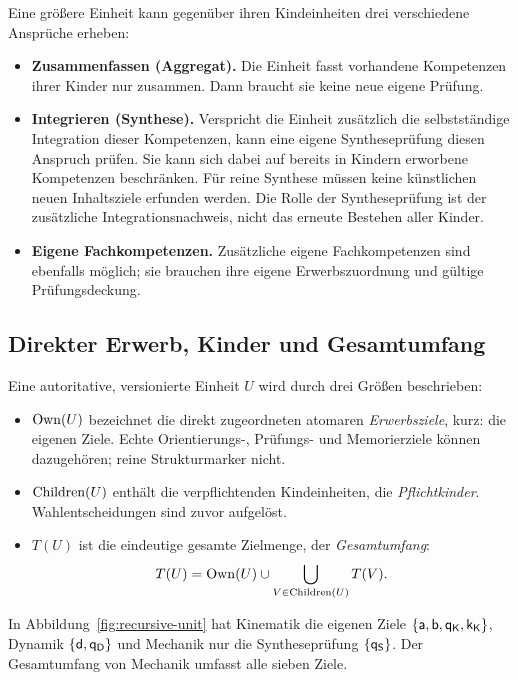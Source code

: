 Eine größere Einheit kann gegenüber ihren Kindeinheiten drei verschiedene
Ansprüche erheben:
\begin{itemize}
\item \textbf{Zusammenfassen (Aggregat).} Die Einheit fasst vorhandene
 Kompetenzen ihrer Kinder nur zusammen. Dann braucht sie keine neue eigene
 Prüfung.
\item \textbf{Integrieren (Synthese).} Verspricht die Einheit zusätzlich die
 selbstständige Integration dieser Kompetenzen, kann eine eigene
 Syntheseprüfung diesen Anspruch prüfen. Sie kann sich dabei auf bereits
 in Kindern erworbene Kompetenzen beschränken. Für reine Synthese müssen
 keine künstlichen neuen Inhaltsziele erfunden werden. Die Rolle der
 Syntheseprüfung ist der zusätzliche Integrationsnachweis, nicht das
 erneute Bestehen aller Kinder.
\item \textbf{Eigene Fachkompetenzen.} Zusätzliche eigene Fachkompetenzen
 sind ebenfalls möglich; sie brauchen ihre eigene Erwerbszuordnung und
 gültige Prüfungsdeckung.
\end{itemize}

\subsection{Direkter Erwerb, Kinder und Gesamtumfang}
Eine autoritative, versionierte Einheit $U$ wird durch drei Größen
beschrieben:
\begin{itemize}
\item $\operatorname{Own}(U)$ bezeichnet die direkt zugeordneten atomaren
 \emph{Erwerbsziele}, kurz: die eigenen Ziele. Echte Orientierungs-,
 Prüfungs- und Memorierziele können dazugehören; reine Strukturmarker nicht.
\item $\operatorname{Children}(U)$ enthält die verpflichtenden Kindeinheiten, die
 \emph{Pflichtkinder}. Wahlentscheidungen sind zuvor aufgelöst.
\item $T(U)$ ist die eindeutige gesamte Zielmenge, der \emph{Gesamtumfang}:
\begin{equation}
 T(U)=\operatorname{Own}(U)\cup\bigcup_{V\in\operatorname{Children}(U)}T(V).
 \label{eq:unit-targets}
\end{equation}
\end{itemize}
In Abbildung~\ref{fig:recursive-unit} hat Kinematik die eigenen Ziele
$\{\mathsf{a},\mathsf{b},\mathsf{q_K},\mathsf{k_K}\}$, Dynamik $\{\mathsf{d},\mathsf{q_D}\}$ und
Mechanik nur die Syntheseprüfung $\{\mathsf{q_S}\}$. Der Gesamtumfang von
Mechanik umfasst alle sieben Ziele.

